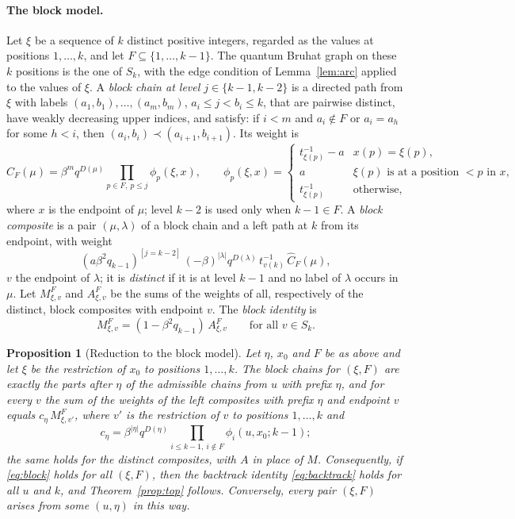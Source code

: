\documentclass[11pt]{article}
\newtheorem{proposition}{Proposition}
\begin{document}
\paragraph{The block model.}
Let $\xi$ be a sequence of $k$ distinct positive integers, regarded as
the values at positions $1,\ldots,k$, and let $F\subseteq\{1,\ldots,k-1\}$.
The quantum Bruhat graph on these $k$ positions is the one of $S_k$,
with the edge condition of Lemma~\ref{lem:arc} applied to the values
of $\xi$. A \emph{block chain at level $j\in\{k-1,k-2\}$} is a
directed path from $\xi$ with labels $(a_1,b_1),\ldots,(a_m,b_m)$,
$a_i\leq j<b_i\leq k$, that are pairwise distinct, have weakly
decreasing upper indices, and satisfy: if $i<m$ and $a_i\notin F$ or
$a_i=a_h$ for some $h<i$, then $(a_i,b_i)\prec(a_{i+1},b_{i+1})$.
Its weight is
\[
 \widehat C_F(\mu)=\beta^{m}q^{D(\mu)}\prod_{p\in F,\ p\leq j}\phi_p(\xi,x),
 \qquad
 \phi_p(\xi,x)=\begin{cases}
  t^{-1}_{\xi(p)}-a& x(p)=\xi(p),\\
  a& \xi(p)\text{ is at a position }<p\text{ in }x,\\
  t^{-1}_{\xi(p)}& \text{otherwise},
 \end{cases}
\]
where $x$ is the endpoint of $\mu$; level $k-2$ is used only when
$k-1\in F$. A \emph{block composite} is a pair $(\mu,\lambda)$ of a
block chain and a left path at $k$ from its endpoint, with weight
\[
 (a\beta^2q_{k-1})^{[j=k-2]}\,(-\beta)^{|\lambda|}q^{D(\lambda)}\,t^{-1}_{v(k)}\,\widehat C_F(\mu),
\]
$v$ the endpoint of $\lambda$; it is \emph{distinct} if it is at level
$k-1$ and no label of $\lambda$ occurs in $\mu$. Let $M^F_{\xi,v}$ and
$A^F_{\xi,v}$ be the sums of the weights of all, respectively of the
distinct, block composites with endpoint $v$. The \emph{block identity}
is
\begin{equation}\label{eq:block}
 M^F_{\xi,v}=(1-\beta^2q_{k-1})\,A^F_{\xi,v}\qquad\text{for all }v\in S_k.
\end{equation}

\begin{proposition}[Reduction to the block model]\label{prop:block-reduction}
Let $\eta$, $x_0$ and $F$ be as above and let $\xi$ be the restriction
of $x_0$ to positions $1,\ldots,k$. The block chains for $(\xi,F)$ are
exactly the parts after $\eta$ of the admissible chains from $u$ with
prefix $\eta$, and for every $v$ the sum of the weights of the left
composites with prefix $\eta$ and endpoint $v$ equals
$c_\eta\,M^F_{\xi,v'}$, where $v'$ is the restriction of $v$ to
positions $1,\ldots,k$ and
\[
 c_\eta=\beta^{|\eta|}q^{D(\eta)}\prod_{i\leq k-1,\ i\notin F}\phi_i(u,x_0;k-1);
\]
the same holds for the distinct composites, with $A$ in place of $M$.
Consequently, if \eqref{eq:block} holds for all $(\xi,F)$, then the
backtrack identity \eqref{eq:backtrack} holds for all $u$ and $k$,
and Theorem~\ref{prop:top} follows. Conversely, every pair $(\xi,F)$
arises from some $(u,\eta)$ in this way.
\end{proposition}
\end{document}
